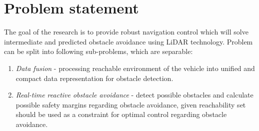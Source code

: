 \section{Problem statement}

The goal of the research is to provide robust navigation control which will solve intermediate and predicted obstacle avoidance using LiDAR technology.
Problem can be split into following sub-problems, which are separable:
\begin{enumerate}
    

    \item  \textit{Data fusion} - processing reachable environment of the vehicle into unified and compact data representation for obstacle detection.
		
    \item  \textit{Real-time reactive obstacle avoidance} - detect possible obstacles and calculate possible safety margins regarding obstacle avoidance, given reachability set should be used as a constraint for optimal control regarding obstacle avoidance.
    
\end{enumerate}